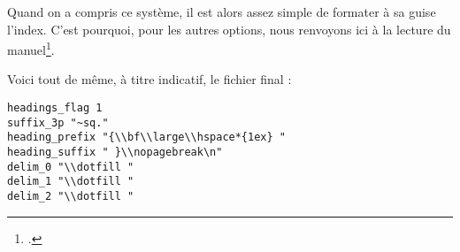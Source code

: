 Quand on a compris ce système, il est alors assez simple de formater à sa guise l'index. C'est pourquoi, pour les autres options, nous renvoyons ici à la lecture du manuel\footcite[On pourra aussi consulter][]{frama_index}. 

Voici tout de même, à titre indicatif, le fichier final :

\begin{verbatim}
headings_flag 1
suffix_3p "~sq."
heading_prefix "{\\bf\\large\\hspace*{1ex} " 
heading_suffix " }\\nopagebreak\n" 
delim_0 "\\dotfill "
delim_1 "\\dotfill "
delim_2 "\\dotfill "
\end{verbatim}




